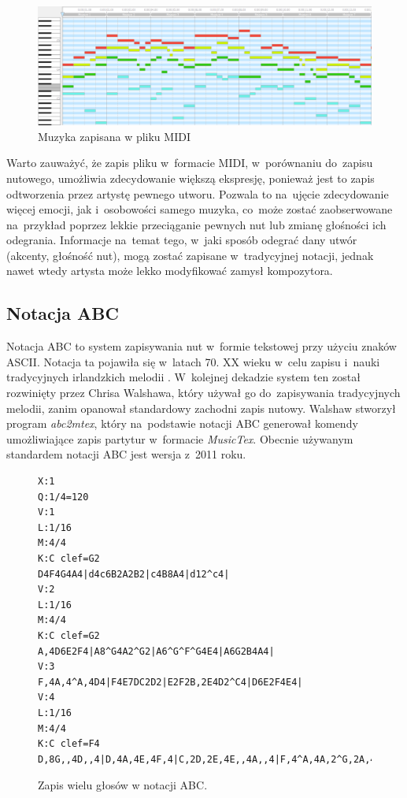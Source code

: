 \documentclass[data-science]{agh-wi} %
\begin{document}
\begin{figure}[ht!]
    \begin{center}
        \includegraphics*[width=\linewidth]{./img/piano_roll.png}
    \end{center}
    \caption{Muzyka zapisana w pliku MIDI}\label{fig:jsb_pianoroll}
\end{figure}

Warto zauważyć, że zapis pliku w~formacie MIDI, w~porównaniu do~zapisu nutowego, umożliwia zdecydowanie większą ekspresję, ponieważ jest to zapis odtworzenia przez artystę pewnego utworu. Pozwala to na~ujęcie zdecydowanie więcej emocji, jak i~osobowości samego muzyka, co~może zostać zaobserwowane na~przykład poprzez lekkie przeciąganie pewnych nut lub zmianę głośności ich odegrania. Informacje na~temat tego, w~jaki sposób odegrać dany utwór (akcenty, głośność nut), mogą zostać zapisane w~tradycyjnej notacji, jednak nawet wtedy artysta może lekko modyfikować zamysł kompozytora.

\subsection{Notacja ABC}
Notacja ABC to system zapisywania nut w~formie tekstowej przy użyciu znaków ASCII. Notacja ta pojawiła się w~latach 70. XX wieku w~celu zapisu i~nauki tradycyjnych irlandzkich melodii \cite{abc_history}. W~kolejnej dekadzie system ten został rozwinięty przez Chrisa Walshawa, który używał go do~zapisywania tradycyjnych melodii, zanim opanował standardowy zachodni zapis nutowy. Walshaw stworzył program \textit{abc2mtex}, który na~podstawie notacji ABC generował komendy umożliwiające zapis partytur w~formacie \textit{MusicTex}. Obecnie używanym standardem notacji ABC jest wersja z~2011 roku.

\begin{figure}[ht!]
    \begin{verbatim}
X:1
Q:1/4=120
V:1
L:1/16
M:4/4
K:C clef=G2
D4F4G4A4|d4c6B2A2B2|c4B8A4|d12^c4|
V:2
L:1/16
M:4/4
K:C clef=G2
A,4D6E2F4|A8^G4A2^G2|A6^G^F^G4E4|A6G2B4A4|
V:3
F,4A,4^A,4D4|F4E7DC2D2|E2F2B,2E4D2^C4|D6E2F4E4|
V:4
L:1/16
M:4/4
K:C clef=F4
D,8G,,4D,,4|D,4A,4E,4F,4|C,2D,2E,4E,,4A,,4|F,4^A,4A,2^G,2A,4|        
\end{verbatim}
    \caption{Zapis wielu głosów w notacji ABC.}\label{fig:abc_polyphony}
\end{figure}
\end{document}
